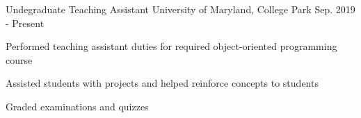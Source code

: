 \begin{cventries}
\cventry
    {Undegraduate Teaching Assistant} %
    {University of Maryland, College Park} %
    {} %
    {Sep. 2019 - Present} %
    {
      \begin{cvitems} %
        \item {Performed teaching assistant duties for required object-oriented programming course}
        \item {Assisted students with projects and helped reinforce concepts to students}
        \item {Graded examinations and quizzes}
        \end{cvitems}
    }


\end{cventries}
